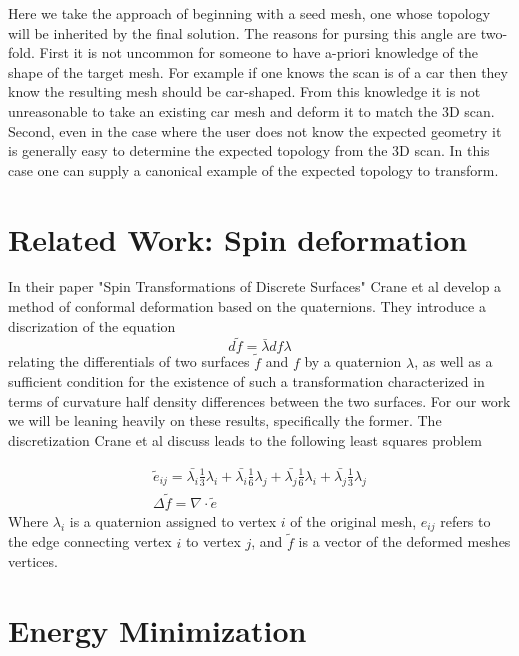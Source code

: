 \documentclass[sigconf]{acmart}
\begin{document}
Here we take the approach of beginning with a seed mesh, one whose topology will be inherited by the final solution. The reasons for pursing this angle are two-fold. First it is not uncommon for someone to have a-priori knowledge of the shape of the target mesh. For example if one knows the scan is of a car then they know the resulting mesh should be car-shaped. From this knowledge it is not unreasonable to take an existing car mesh and deform it to match the 3D scan. Second, even in the case where the user does not know the expected geometry it is generally easy to determine the expected topology from the 3D scan. In this case one can supply a canonical example of the expected topology to transform. 


\section{Related Work: Spin deformation}
In their paper "Spin Transformations of Discrete Surfaces" \cite{Crane:2011:STD} Crane et al develop a method of conformal deformation based on the quaternions. They introduce a discrization of the equation
\begin{equation}
\label{eqn:01}
d\tilde{f} = \bar{\lambda}df\lambda 
\end{equation}
relating the differentials of two surfaces $\tilde{f}$ and $f$ by a quaternion $\lambda$, as well as a sufficient condition for the existence of such a transformation characterized in terms of curvature half density differences between the two surfaces. For our work we will be leaning heavily on these results, specifically the former. The discretization Crane et al discuss leads to the following least squares problem

\begin{align}
\label{eqn:02}
\tilde{e}_{ij} = \bar{\lambda_{i}}\frac{1}{3}\lambda_{i} + \bar{\lambda_{i}}\frac{1}{6}\lambda_{j} + \bar{\lambda_{j}}\frac{1}{6}\lambda_{i} + \bar{\lambda_{j}}\frac{1}{3}\lambda_{j} \\
\Delta \tilde{f} = \nabla \cdot \tilde{e}
\end{align}
Where $\lambda_{i}$ is a quaternion assigned to vertex $i$ of the original mesh, $e_{ij}$ refers to the edge connecting vertex $i$ to vertex $j$, and $\tilde{f}$ is a vector of the deformed meshes vertices.


\section{Energy Minimization}
\end{document}
